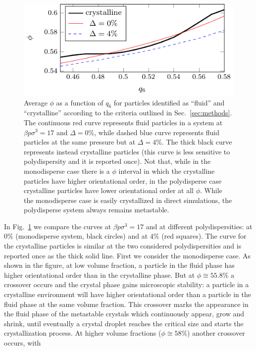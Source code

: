 \documentclass[twocolumn,superscriptaddress]{revtex4}
\begin{document}
\begin{figure}
 \centering
 \includegraphics{fig_stability_map}
 \caption{Average $\phi$ as a function of $q_6$ for particles identified as ``fluid'' and ``crystalline'' according to the criteria outlined in Sec.~\ref{sec:methods}. The continuous red curve represents fluid particles in a system at $\beta p\sigma^3=17$ and $\Delta=0\%$, while dashed blue curve represents fluid particles at the same pressure but at $\Delta=4\%$. The thick black curve represents instead crystalline particles (this curve is less sensitive to polydispersity and it is reported once).
 Not that, while in the monodisperse case there is a $\phi$ interval in which the crystalline particles have higher orientational order, in the polydisperse
 case crystalline particles have lower orientational order at all $\phi$. While the monodisperse case is easily crystallized in direct simulations, the polydisperse
 system always remains metastable.}
 \label{fig:stability_map}
\end{figure}
In Fig.~\ref{fig:stability_map}
we compare the curves at $\beta p\sigma^3=17$ and at different polydispersities:
at $0\%$ (monodisperse system, black circles) and at $4\%$ (red squares). The curve for the
crystalline particles is similar at the two considered polydispersities and is reported once
as the thick solid line. First we consider the monodisperse case. As shown in the figure,
at low volume fraction, a particle in the fluid phase has higher orientational order than in the crystalline phase.
But at $\phi\cong 55.8\%$ a crossover
occurs and the crystal phase gains microscopic stability: a particle in a crystalline environment will
have higher orientational order than a particle in the fluid phase at the same volume fraction.
This crossover marks the appearance in the fluid phase of the metastable crystals which continuously
appear, grow and shrink, until eventually a crystal droplet reaches the critical size and starts the
crystallization process.
At higher volume fractions ($\phi\cong 58\%$) another crossover occurs, with
\end{document}
